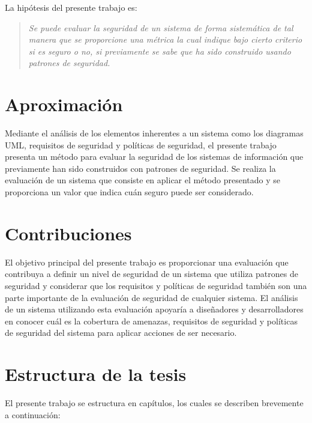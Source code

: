 La hipótesis del presente trabajo es:

\begin{quote}
	\textit{Se puede evaluar la seguridad de un sistema de forma sistemática de tal manera que se proporcione una métrica la cual indique bajo cierto criterio si es seguro o no, si previamente se sabe que ha sido construido usando patrones de seguridad.}
\end{quote}


\section{Aproximación}

Mediante el análisis de los elementos inherentes a un sistema como los diagramas UML, requisitos de seguridad y políticas de seguridad, el presente trabajo presenta un método para evaluar la seguridad de los sistemas de información que previamente han sido construidos con patrones de seguridad. Se realiza la evaluación de un sistema que consiste en aplicar el método presentado y se proporciona un valor que indica cuán seguro puede ser considerado. 

\section{Contribuciones}

El objetivo principal del presente trabajo es proporcionar una evaluación que contribuya a definir un nivel de seguridad de un sistema que utiliza patrones de seguridad y considerar que los requisitos y políticas de seguridad también son una parte importante de la evaluación de seguridad de cualquier sistema. El análisis de un sistema utilizando esta evaluación apoyaría a  diseñadores y desarrolladores en conocer cuál es la cobertura de amenazas, requisitos de seguridad y políticas de seguridad del sistema para aplicar acciones de ser necesario. 


\section {Estructura de la tesis}

El presente trabajo se estructura en capítulos, los cuales se describen brevemente a continuación:

